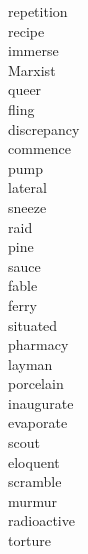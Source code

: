 \documentclass[a4paper, 11pt]{ctexart}
\begin{document}
\begin{multicols*}{3}
\begin{description}
\item[repetition]

\item[recipe]

\item[immerse]

\item[Marxist]

\item[queer]

\item[fling]

\item[discrepancy]

\item[commence]

\item[pump]

\item[lateral]

\item[sneeze]

\item[raid]

\item[pine]

\item[sauce]

\item[fable]

\item[ferry]

\item[situated]

\item[pharmacy]

\item[layman]

\item[porcelain]

\item[inaugurate]

\item[evaporate]

\item[scout]

\item[eloquent]

\item[scramble]

\item[murmur]

\item[radioactive]

\item[torture]


\end{description}
\end{multicols*}
\end{document}
